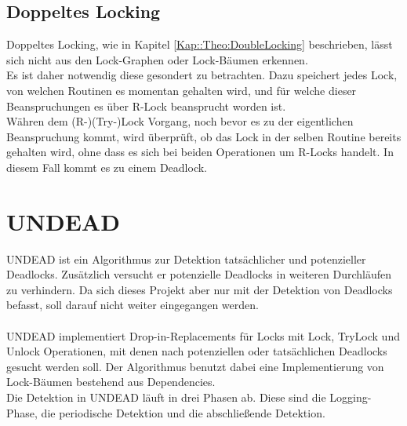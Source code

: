 \subsection{Doppeltes Locking}
Doppeltes Locking, wie in Kapitel \ref{Kap::Theo:DoubleLocking} beschrieben,
 lässt sich nicht aus den Lock-Graphen oder Lock-Bäumen erkennen.\\
Es ist daher notwendig diese gesondert zu betrachten. Dazu speichert jedes Lock, 
von welchen Routinen es momentan gehalten wird, und für welche dieser 
Beanspruchungen es über R-Lock beansprucht worden ist.\\
Währen dem (R-)(Try-)Lock Vorgang, noch bevor es zu der eigentlichen Beanspruchung 
kommt, wird überprüft, ob das Lock in der selben Routine bereits gehalten 
wird, ohne dass es sich bei beiden Operationen um R-Locks handelt. In diesem 
Fall kommt es zu einem Deadlock.
\section{UNDEAD} \label{Kap::Theo:UNDEAD}
UNDEAD \cite{zhou} ist ein Algorithmus zur Detektion tatsächlicher und 
potenzieller Deadlocks. Zusätzlich versucht er potenzielle Deadlocks 
in weiteren Durchläufen zu verhindern. Da sich dieses Projekt aber nur mit der 
Detektion von Deadlocks befasst, soll darauf nicht weiter eingegangen werden.\\\\ 
UNDEAD implementiert Drop-in-Replacements für Locks mit Lock, TryLock und Unlock
Operationen, mit denen nach potenziellen oder tatsächlichen Deadlocks gesucht 
werden soll. Der Algorithmus benutzt dabei eine Implementierung von Lock-Bäumen 
bestehend aus Dependencies.\\
Die Detektion in UNDEAD läuft in drei Phasen ab. Diese sind die Logging-Phase, 
die periodische Detektion und die abschließende Detektion.
